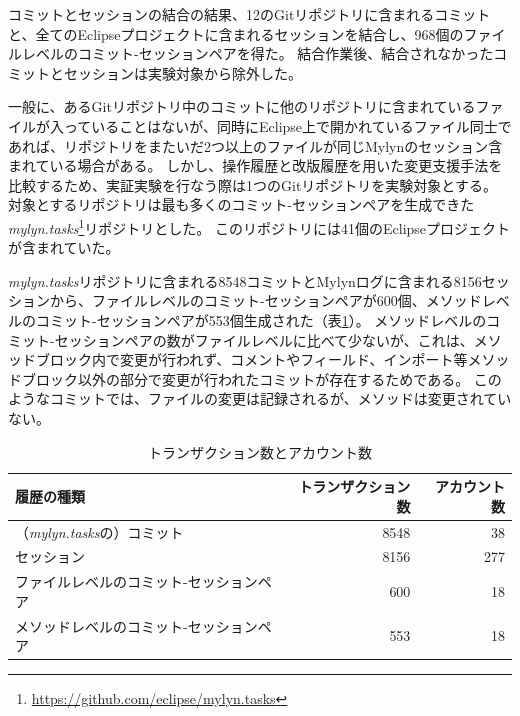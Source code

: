 \documentclass[a4paper]{jsbook}
\begin{document}
コミットとセッションの結合の結果、12のGitリポジトリに含まれるコミットと、全てのEclipseプロジェクトに含まれるセッションを結合し、968個のファイルレベルのコミット-セッションペアを得た。
結合作業後、結合されなかったコミットとセッションは実験対象から除外した。

一般に、あるGitリポジトリ中のコミットに他のリポジトリに含まれているファイルが入っていることはないが、同時にEclipse上で開かれているファイル同士であれば、リポジトリをまたいだ2つ以上のファイルが同じMylynのセッション含まれている場合がある。
しかし、操作履歴と改版履歴を用いた変更支援手法を比較するため、実証実験を行なう際は1つのGitリポジトリを実験対象とする。
対象とするリポジトリは最も多くのコミット-セッションペアを生成できた{\it mylyn.tasks}\footnote{\url{https://github.com/eclipse/mylyn.tasks}}リポジトリとした。
このリポジトリには41個のEclipseプロジェクトが含まれていた。

{\it mylyn.tasks}リポジトリに含まれる8548コミットとMylynログに含まれる8156セッションから、ファイルレベルのコミット-セッションペアが600個、メソッドレベルのコミット-セッションペアが553個生成された（表\ref{transaction}）。
メソッドレベルのコミット-セッションペアの数がファイルレベルに比べて少ないが、これは、メソッドブロック内で変更が行われず、コメントやフィールド、インポート等メソッドブロック以外の部分で変更が行われたコミットが存在するためである。
このようなコミットでは、ファイルの変更は記録されるが、メソッドは変更されていない。
\begin{table}[tb]
  \begin{center}
    \caption{トランザクション数とアカウント数}
\label{transaction}
\begin{tabular}{lrr}
  \hline
  履歴の種類 & トランザクション数 & アカウント数\\
  \hline
  （{\it mylyn.tasks}の）コミット & 8548 &38\\
  セッション & 8156 &277\\
  \hline
  ファイルレベルのコミット-セッションペア & 600 & 18\\
  メソッドレベルのコミット-セッションペア & 553 & 18\\
  \hline
\end{tabular}
  \end{center}
\end{table}
\end{document}
